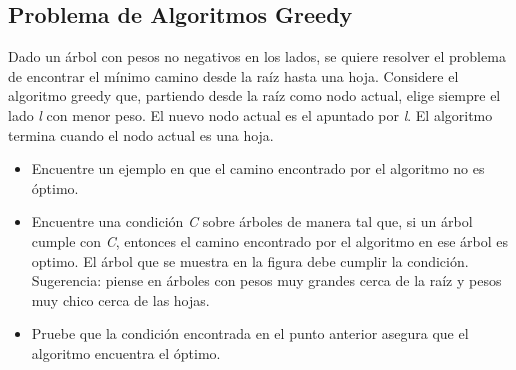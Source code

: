 \documentclass[10pt]{article}
\begin{document}
	\subsection*{Problema de Algoritmos Greedy}
	Dado un  \'arbol con pesos no negativos en los lados, se quiere resolver el problema de encontrar el m\'inimo camino desde la ra\'iz hasta una hoja. Considere el algoritmo greedy que, partiendo desde la ra\'iz como nodo actual, elige siempre el lado \textit{l} con menor peso. El nuevo nodo actual es
	el apuntado por \textit{l}. El algoritmo termina cuando el nodo actual es una hoja.
	\begin{itemize}
		\item Encuentre un ejemplo en que el camino encontrado por el algoritmo no es \'optimo.
		\item Encuentre una condici\'on \textit{C} sobre \'arboles de manera tal que, si un \'arbol cumple con \textit{C}, entonces el camino encontrado por el algoritmo en ese \'arbol es optimo. El \'arbol que se muestra en la figura debe cumplir la condici\'on. Sugerencia: piense en \'arboles con pesos muy grandes cerca de la ra\'iz y pesos muy chico cerca de las hojas.
		\newline
		\begin{center}
		\end{center}
		\item Pruebe que la condici\'on encontrada en el punto anterior asegura que el algoritmo encuentra el \'optimo.
	\end{itemize}
	\newpage
\end{document}
